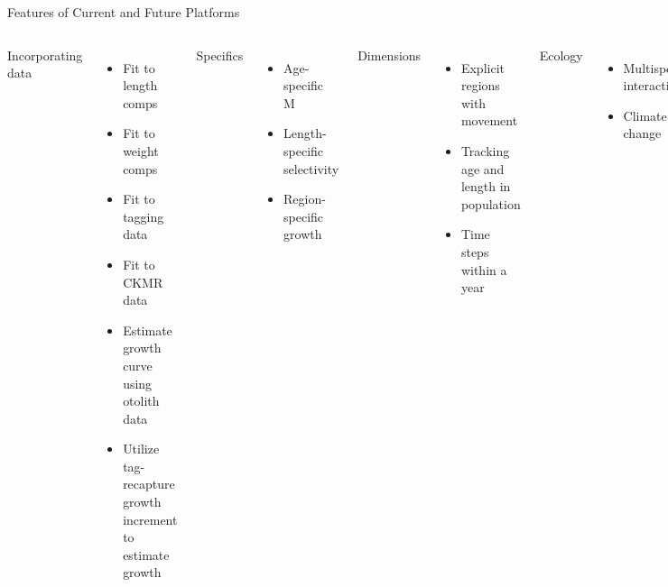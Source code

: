 \documentclass[aspectratio=169,fleqn]{beamer}
\begin{document}
\begin{frame}{Features of Current and Future Platforms}\small
  \vspace{-1.5ex}
  \begin{columns}[T]
    \gray Incorporating data\\[-0.5ex]
    \begin{itemize}\fns
      \item Fit to length comps\\[-1ex]
      \item Fit to weight comps\\[-1ex]
      \item Fit to tagging data\\[-1ex]
      \item Fit to CKMR data\\[-1ex]
      \item Estimate growth curve using otolith data\\[-1ex]
      \item Utilize tag-recapture growth increment to estimate growth\\[3ex]
    \end{itemize}
    Specifics\\[-0.5ex]
    \begin{itemize}\fns
      \item Age-specific M\\[-1ex]
      \item Length-specific selectivity\\[-1ex]
      \item Region-specific growth
    \end{itemize}
    \gray Dimensions\\[-0.5ex]
    \begin{itemize}\fns
      \item Explicit regions with movement\\[-1ex]
      \item Tracking age and length in population\\[-1ex]
      \item Time steps within a year\\[3ex]
    \end{itemize}
    Ecology\\[-0.5ex]
    \begin{itemize}\fns
      \item Multispecies interactions\\[-1ex]
      \item Climate change\\[3ex]

\end{itemize}
\end{columns}
\end{frame}
\end{document}
